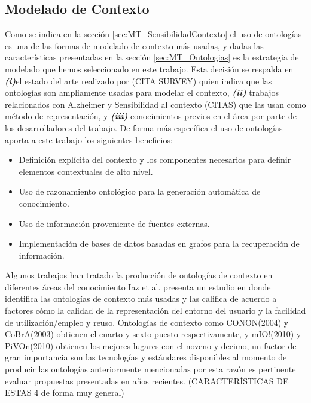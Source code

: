 \subsection{Modelado de Contexto}
\label{subsec:Prop_Modelado}

Como se indica en la sección \ref{sec:MT_SensibilidadContexto} el uso de ontologías es una de las formas de modelado de contexto más usadas, y dadas las características presentadas en la sección \ref{sec:MT_Ontologias} es la estrategia de modelado que hemos seleccionado en este trabajo. Esta decisión se respalda en \textbf{\textit{(i)}}el estado del arte realizado por (CITA SURVEY) \cite{Iaz2014} quien indica que las ontologías son ampliamente usadas para modelar el contexto, \textbf{\textit{(ii)}} trabajos relacionados con Alzheimer y Sensibilidad al contexto (CITAS) que las usan como método de representación, y \textbf{\textit{(iii)}} conocimientos previos en el área por parte de los desarrolladores del trabajo. De forma más específica el uso de ontologías aporta a este trabajo los siguientes beneficios:

\begin{itemize}
    \item Definición explícita del contexto y los componentes necesarios para definir elementos contextuales de alto nivel.
    \item Uso de razonamiento ontológico para la generación automática de conocimiento.
    \item Uso de información proveniente de fuentes externas.
    \item Implementación de bases de datos basadas en grafos para la recuperación de información.
\end{itemize}

Algunos trabajos han tratado la producción de ontologías de contexto en diferentes áreas del conocimiento \cite{Iaz2014} Iaz et al. presenta un estudio en donde identifica las ontologías de contexto más usadas y las califica de acuerdo a factores cómo la calidad de la representación del entorno del usuario y la facilidad de utilización/empleo y reuso. Ontologías de contexto como \cite{TODAS ESTAS TIENEN QUE IR CON CITA}CONON(2004) y CoBrA(2003) obtienen el cuarto y sexto puesto respectivamente, y mIO!(2010) y PiVOn(2010) obtienen los mejores lugares con el noveno y decimo, un factor de gran importancia son las tecnologías y estándares disponibles al momento de producir las ontologías anteriormente mencionadas por esta razón es pertinente evaluar propuestas presentadas en años recientes. (CARACTERÍSTICAS DE ESTAS 4 de forma muy general)

